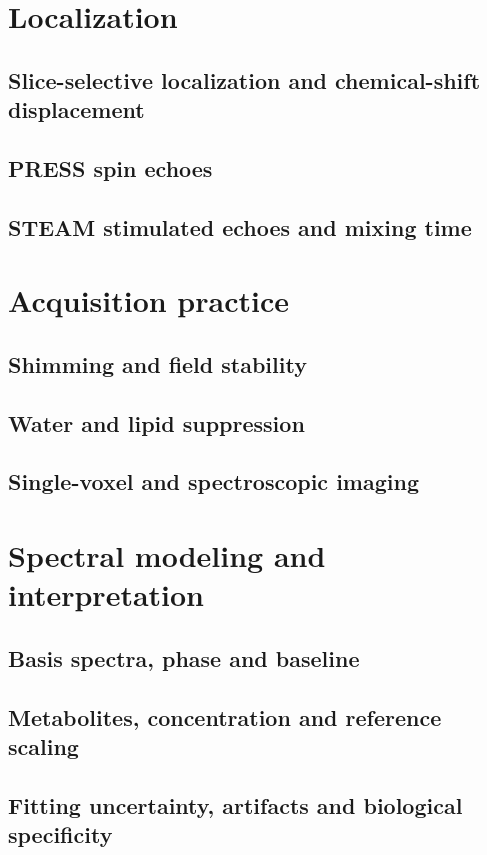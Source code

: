 \section{Localization}
\label{sec:20:localization}
\subsection{Slice-selective localization and chemical-shift displacement}
\subsection{PRESS spin echoes}
\subsection{STEAM stimulated echoes and mixing time}

\section{Acquisition practice}
\label{sec:20:acquisition-practice}
\subsection{Shimming and field stability}
\subsection{Water and lipid suppression}
\subsection{Single-voxel and spectroscopic imaging}

\section{Spectral modeling and interpretation}
\label{sec:20:spectral-modeling-and-interpretation}
\subsection{Basis spectra, phase and baseline}
\subsection{Metabolites, concentration and reference scaling}
\subsection{Fitting uncertainty, artifacts and biological specificity}

